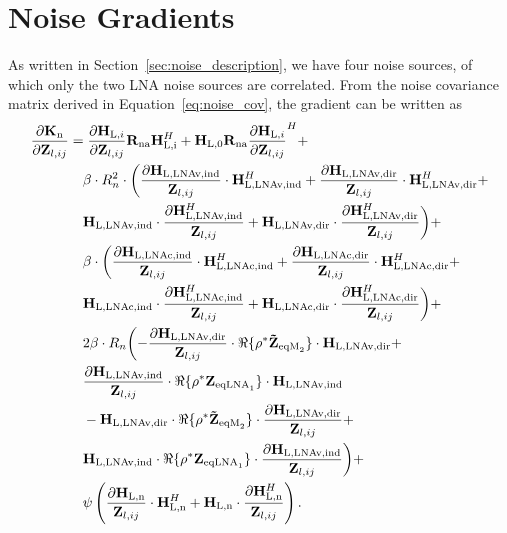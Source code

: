 \section{Noise Gradients}
\label{sec:noise_gradient}

As written in Section~\ref{sec:noise_description}, we have four noise sources, of which only the two LNA noise sources are correlated.
From the noise covariance matrix derived in Equation~\eqref{eq:noise_cov}, the gradient can be written as
\begin{align}
\label{eq:noise_grad}\nonumber
\frac{\partial\mathbf{K}_\text{n}}{\partial\mathbf{Z}_{l,ij}} &= 
\frac{\partial\mathbf{H}_{\text{L,}i}}{\partial\mathbf{Z}_{l,ij}}
	\mathbf{R}_\text{na}\mathbf{H}_\text{\text{L,}i}^H +
	\mathbf{H}_\text{L,0}\mathbf{R}_\text{na}
	\frac{\partial \mathbf{H}_{\text{L,}i}}{\partial\mathbf{Z}_{l,ij}}^H+\\\nonumber
&\quad	\beta \cdot R_n^2\cdot\biggl(
	\frac{\partial \mathbf{H}_\text{L,LNAv,ind}}{\mathbf{Z}_{l,ij}}\cdot
	\mathbf{H}_\text{L,LNAv,ind}^H+
	\frac{\partial \mathbf{H}_\text{L,LNAv,dir}}{\mathbf{Z}_{l,ij}}\cdot
	\mathbf{H}_\text{L,LNAv,dir}^H + \\\nonumber
&\quad	\mathbf{H}_\text{L,LNAv,ind}\cdot
	\frac{\partial\mathbf{H}_\text{L,LNAv,ind}^H}{\mathbf{Z}_{l,ij}} +
	\mathbf{H}_\text{L,LNAv,dir}\cdot
	\frac{\partial\mathbf{H}_\text{L,LNAv,dir}^H}{\mathbf{Z}_{l,ij}}
	\biggr)+\\\nonumber
&\quad	\beta \cdot \biggl(
	\frac{\partial\mathbf{H}_\text{L,LNAc,ind}}{\mathbf{Z}_{l,ij}}\cdot
	\mathbf{H}_\text{L,LNAc,ind}^H+
	\frac{\partial\mathbf{H}_\text{L,LNAc,dir}}{\mathbf{Z}_{l,ij}}\cdot
	\mathbf{H}_\text{L,LNAc,dir}^H+\\\nonumber
&\quad	\mathbf{H}_\text{L,LNAc,ind}\cdot
	\frac{\partial\mathbf{H}_\text{L,LNAc,ind}^H}{\mathbf{Z}_{l,ij}}+
	\mathbf{H}_\text{L,LNAc,dir}\cdot
	\frac{\partial\mathbf{H}_\text{L,LNAc,dir}^H}{\mathbf{Z}_{l,ij}}
	\biggr)+\\\nonumber
&\quad	2\beta \cdot R_n\biggl(
	-\frac{\partial\mathbf{H}_\text{L,LNAv,dir}}{\mathbf{Z}_{l,ij}} \cdot
	\Re\{\rho^*\mathbf{\tilde{Z}}_{\text{eqM}_2}\}\cdot
	\mathbf{H}_\text{L,LNAv,dir}+\\\nonumber
&\quad	\frac{\partial\mathbf{H}_\text{L,LNAv,ind}}{\mathbf{Z}_{l,ij}} \cdot
	\Re\{\rho^*\mathbf{Z}_{\text{eqLNA}_1}\}\cdot
	\mathbf{H}_\text{L,LNAv,ind}\\\nonumber
&\quad	-\mathbf{H}_\text{L,LNAv,dir} \cdot
	\Re\{\rho^*\mathbf{\tilde{Z}}_{\text{eqM}_2}\}\cdot
	\frac{\partial\mathbf{H}_\text{L,LNAv,dir}}{\mathbf{Z}_{l,ij}}+\\\nonumber
&\quad	\mathbf{H}_\text{L,LNAv,ind} \cdot
	\Re\{\rho^*\mathbf{Z}_{\text{eqLNA}_1}\}\cdot
	\frac{\partial\mathbf{H}_\text{L,LNAv,ind}}{\mathbf{Z}_{l,ij}}
	\biggr)+\\
&\quad	\psi\left(
	\frac{\partial\mathbf{H}_\text{L,n}}{\mathbf{Z}_{l,ij}} \cdot \mathbf{H}_\text{L,n}^H+
	\mathbf{H}_\text{L,n}\cdot\frac{\partial\mathbf{H}_\text{L,n}^H}{\mathbf{Z}_{l,ij}}
	\right).
\end{align}
